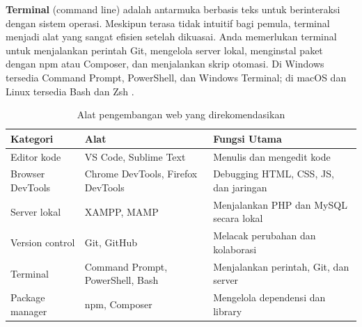 \textbf{Terminal} (command line) adalah antarmuka berbasis teks untuk berinteraksi dengan sistem operasi. Meskipun terasa tidak intuitif bagi pemula, terminal menjadi alat yang sangat efisien setelah dikuasai. Anda memerlukan terminal untuk menjalankan perintah Git, mengelola server lokal, menginstal paket dengan npm atau Composer, dan menjalankan skrip otomasi. Di Windows tersedia Command Prompt, PowerShell, dan Windows Terminal; di macOS dan Linux tersedia Bash dan Zsh \cite{mdnToolsTesting}.

\begin{table}[H]
\centering
\begin{tabular}{|P{3.5cm}|P{3.5cm}|P{4.5cm}|}
\hline
\textbf{Kategori} & \textbf{Alat} & \textbf{Fungsi Utama} \\
\hline
Editor kode & VS Code, Sublime Text & Menulis dan mengedit kode \\
\hline
Browser DevTools & Chrome DevTools, Firefox DevTools & Debugging HTML, CSS, JS, dan jaringan \\
\hline
Server lokal & XAMPP, MAMP & Menjalankan PHP dan MySQL secara lokal \\
\hline
Version control & Git, GitHub & Melacak perubahan dan kolaborasi \\
\hline
Terminal & Command Prompt, PowerShell, Bash & Menjalankan perintah, Git, dan server \\
\hline
Package manager & npm, Composer & Mengelola dependensi dan library \\
\hline
\end{tabular}
\caption{Alat pengembangan web yang direkomendasikan}
\end{table}

